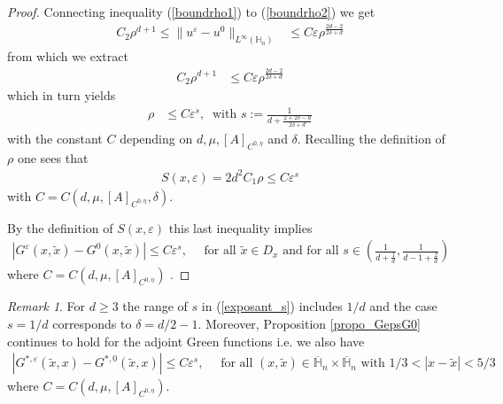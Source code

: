 \documentclass[11pt, reqno]{amsart}
\theoremstyle{definition}
\theoremstyle{remark}
\newtheorem{remark}[theorem]{Remark}
\numberwithin{equation}{section}
\begin{document}
\begin{proof}[Proof]
			\noindent 	Connecting inequality (\ref{boundrho1}) to (\ref{boundrho2}) we get 
			\begin{align}
				C_2 \rho^{d+1} \leq\|u^{\varepsilon} - u^0\|_{L^\infty(\mathbb{H}_n)} 
				&\leq C \varepsilon \rho^{\frac{2d-2}{2\delta +d }}  
			\end{align}
			from which  we extract 
			\begin{align}
				C_2 \rho^{d+1}   &\leq C  \varepsilon \rho^{\frac{2d-2}{2\delta +d }}  \nonumber
			\end{align}		
			which in turn yields
			\begin{align}\label{exposant_s}
				\rho &\leq C \varepsilon^s, \: \mbox{ with } s:= \frac{1}{d+\frac{2+2\delta -d}{2\delta +d }} 	 
			\end{align}		
			with the constant $C$ depending on $d,\mu,[A]_{C^{0,\eta}}$ and  $\delta$. Recalling the definition of 	$\rho$ one sees that
			\begin{align}
				S(x,\varepsilon)= 2d^2	C_1 \rho \leq C  \varepsilon^s\nonumber
			\end{align} with $C=C(d,\mu,[A]_{C^{0,\eta}},\delta)$.
			
			
			\noindent	By the definition of $	S(x,\varepsilon)$ this last inequality implies 
			\begin{align*}
				|G^{\varepsilon}(x,\tilde{x}) - G^0(x,\tilde{x}) | \leq C \varepsilon^s, \quad \mbox{ for all } \tilde{x}\in D_x
				\mbox{ and for all } s\in \left(\frac{1}{d+\frac{1}{d}},  \frac{1}{d-1 +\frac{2}{d}}\right)
			\end{align*}
			where 	 $C=C(d,\mu,[A]_{C^{0,\eta}} ) $ .
		\end{proof}
		\begin{remark}
			For $d\geq 3$ the range of $s$ in \textup{(\ref{exposant_s})} includes $1/d$ and the case $s=1/d$ corresponds to $\delta=d/2-1$. Moreover, Proposition \textup{\ref{propo_GepsG0}} continues to hold  for the adjoint Green functions i.e. we also have 
			\begin{align*}
				|G^{*,\varepsilon}(\tilde{x},x) - G^{*,0}(\tilde{x},x) | \leq C \varepsilon^s, \quad \mbox{ for all } (x,\tilde{x})\in     \overline{\mathbb{H}}_n  \times  \overline{\mathbb{H}}_n   \mbox{ with } 1/3<|x-\tilde{x}|<5/3\end{align*}where  $C=C(d,\mu,[A]_{C^{0,\eta}} ) $.
		\end{remark}
		
	
\end{document}
